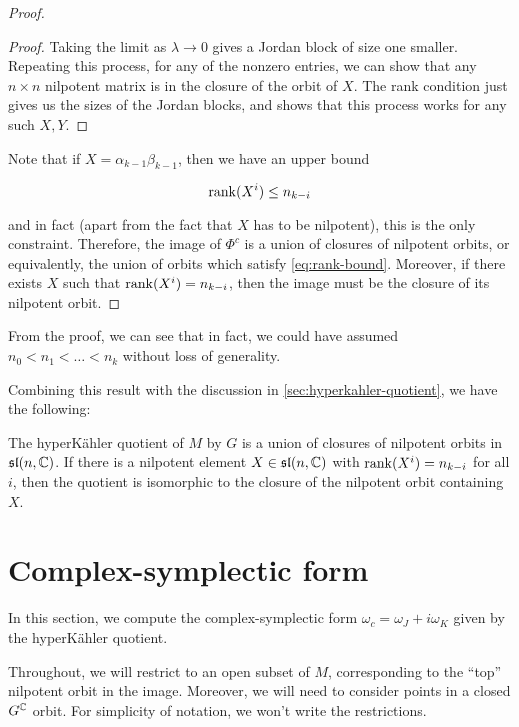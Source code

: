 \documentclass{report}
\renewcommand{\sl}{\mathfrak{sl}}
\begin{document}
\begin{proof}
\begin{proof}
        Taking the limit as \(\lambda \to 0\) gives a Jordan block of size one smaller. Repeating this process, for any of the nonzero entries, we can show that any \(n \times n\) nilpotent matrix is in the closure of the orbit of \(X\). The rank condition just gives us the sizes of the Jordan blocks, and shows that this process works for any such \(X, Y\).
    \end{proof}

    Note that if \(X = \alpha_{k-1}\beta_{k-1}\), then we have an upper bound

    \begin{equation}
        \label{eq:rank-bound}
        \rank(X^i) \le n_{k-i}
    \end{equation}

    and in fact (apart from the fact that \(X\) has to be nilpotent), this is the only constraint. Therefore, the image of \(\Phi^c\) is a union of closures of nilpotent orbits, or equivalently, the union of orbits which satisfy \cref{eq:rank-bound}. Moreover, if there exists \(X\) such that \(\rank(X^i) = n_{k-i}\), then the image must be the closure of its nilpotent orbit.
\end{proof}

\begin{remark}
    From the proof, we can see that in fact, we could have assumed \(n_0 < n_1 < \dots < n_k\) without loss of generality.
\end{remark}

Combining this result with the discussion in \cref{sec:hyperkahler-quotient}, we have the following:

\begin{theorem}
    The hyperK\"ahler quotient of \(M\) by \(G\) is a union of closures of nilpotent orbits in \(\sl(n, \C)\). If there is a nilpotent element \(X \in \sl(n, \C)\) with \(\rank(X^i) = n_{k-i}\) for all \(i\), then the quotient is isomorphic to the closure of the nilpotent orbit containing \(X\).
\end{theorem}

\section{Complex-symplectic form}

In this section, we compute the complex-symplectic form \(\omega_c = \omega_J + i\omega_K\) given by the hyperK\"ahler quotient. 

Throughout, we will restrict to an open subset of \(M\), corresponding to the ``top'' nilpotent orbit in the image. Moreover, we will need to consider points in a closed \(G^{\mathbb{C}}\) orbit. For simplicity of notation, we won't write the restrictions. 
\end{document}
